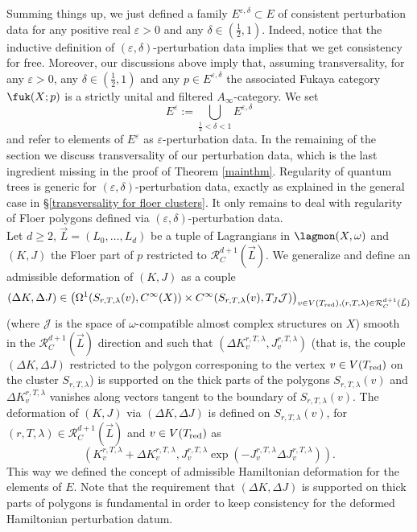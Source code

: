 	Summing things up, we just defined a family $E^{\varepsilon,\delta}\subset E$ of consistent perturbation data for any positive real $\varepsilon>0$ and any $\delta\in \left(\frac{1}{2},1\right)$. Indeed, notice that the inductive definition of $(\varepsilon,\delta)$-perturbation data implies that we get consistency for free. Moreover, our discussions above imply that, assuming transversality, for any $\varepsilon>0$, any $\delta\in \left(\frac{1}{2},1\right)$ and any $p\in E^{\varepsilon,\delta}$ the associated Fukaya category $\fuk(X;p)$ is a strictly unital and filtered $A_\infty$-category. We set $$E^\varepsilon:=\bigcup_{\frac{1}{2}<\delta<1} E^{\varepsilon,\delta}$$ and refer to elements of $E^\varepsilon$ as $\varepsilon$-perturbation data. In the remaining of the section we discuss transversality of our perturbation data, which is the last ingredient missing in the proof of Theorem \ref{mainthm}. Regularity of quantum trees is generic for $(\varepsilon,\delta)$-perturbation data, exactly as explained in the general case in \S \ref{transversality for floer clusters}. It only remains to deal with regularity of Floer polygons defined via $(\varepsilon,\delta)$-perturbation data. \\
	Let $d\geq 2$, $\vec{L}=(L_0,\ldots, L_d)$ be a tuple of Lagrangians in $\lagmon(X,\omega)$ and $(K, J)$ the Floer part of $p$ restricted to $\mathcal{R}^{d+1}_C(\vec{L})$. We generalize \cite[Chapter 9k]{Se:book-fukaya-categ} and define an admissible deformation of $(K, J)$ as a couple $$(\Delta K, \Delta J)\in \left(\Omega^1(S_{r,T,\lambda}(v), C^\infty(X))\times C^\infty(S_{r,T,\lambda}(v), T_J\mathcal{J})\right)_{v\in V(T_\textnormal{red}), (r,T,\lambda)\in \mathcal{R}^{d+1}_C(\vec{L})}$$ (where $\mathcal{J}$ is the space of $\omega$-compatible almost complex structures on $X$) smooth in the $\mathcal{R}^{d+1}_C(\vec{L})$ direction and such that $(\Delta K^{r,T,\lambda}_v, J^{r,T,\lambda}_v)$ (that is, the couple $(\Delta K, \Delta J)$ restricted to the polygon corresponing to the vertex $v\in V(T_\textnormal{red})$ on the cluster $S_{r,T,\lambda}$) is supported on the thick parts of the polygons $S_{r,T,\lambda}(v)$ and $\Delta K^{r,T,\lambda}_v$ vanishes along vectors tangent to the boundary of $S_{r,T,\lambda}(v)$. The deformation of $(K, J)$ via $(\Delta K, \Delta J)$ is defined on $S_{r,T,\lambda}(v)$, for $(r,T,\lambda)\in \mathcal{R}^{d+1}_C(\vec{L})$ and $v\in V(T_\textnormal{red})$ as $$\left(K^{r,T,\lambda}_v+ \Delta K^{r,T,\lambda}_v, J^{r,T,\lambda}_v\exp(-J^{r,T,\lambda}_v\Delta J^{r,T,\lambda}_v)\right).$$ This way we defined the concept of admissible Hamiltonian deformation for the elements of $E$. Note that the requirement that $(\Delta K, \Delta J)$ is supported on thick parts of polygons is fundamental in order to keep consistency for the deformed Hamiltonian perturbation datum.
	
